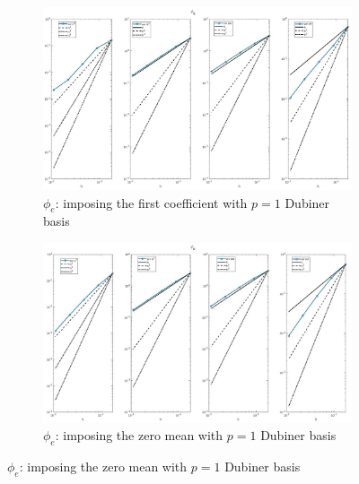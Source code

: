 \documentclass[a4paper,11pt]{article}
\begin{document}
\begin{figure}[H]
\caption{Comparison of the extracellular potential ($\phi_e$)}
\label{phie-unique}
\begin{subfigure}{\textwidth}
\begin{center}
\includegraphics[width = \textwidth]{./D1_Phie_1.jpg}
\caption{$\phi_e$: imposing the first coefficient with $p=1$ Dubiner basis}
\end{center}
\end{subfigure}
\begin{subfigure}{\textwidth}
\begin{center}
\includegraphics[width =\textwidth]{./D1_Phie_2.jpg}
\caption{$\phi_e$: imposing the zero mean with $p=1$ Dubiner basis}
\end{center}
\end{subfigure}
\end{figure}
\newpage
\end{document}
